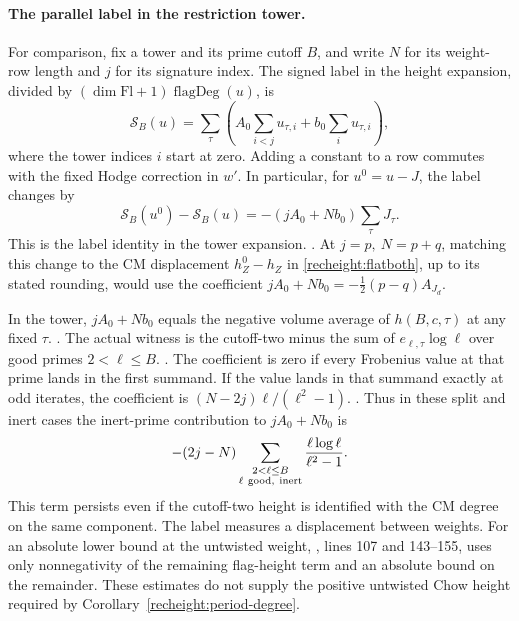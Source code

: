 \paragraph{The parallel label in the restriction tower.}
For comparison, fix a tower and its prime cutoff \(B\), and write
\(N\) for its weight-row length and \(j\) for its signature index.
The signed label in the height expansion, divided by
\((\dim\mathrm{Fl}+1)\operatorname{flagDeg}(u)\), is
\[
 \mathcal S_B(u)=\sum_\tau
   \left(A_0\sum_{i<j}u_{\tau,i}+b_0\sum_i u_{\tau,i}\right),
\]
where the tower indices \(i\) start at zero. Adding a constant to a
row commutes with the fixed Hodge correction in \(w'\). In particular,
for \(u^0=u-J\), the label changes by
\[
 \mathcal S_B(u^0)-\mathcal S_B(u)
        =-(jA_0+Nb_0)\sum_\tau J_\tau .
\]
This is the label identity in the tower expansion.
.
At \(j=p,\ N=p+q\), matching
this change to the CM displacement \(h_Z^0-h_Z\) in
\eqref{recheight:flatboth}, up to its stated rounding, would use the
coefficient \(jA_0+Nb_0=-\tfrac12(p-q)A_{J_d}\).

In the tower, \(jA_0+Nb_0\) equals the negative volume average of
\(h(B,c,\tau)\) at any fixed \(\tau\).
.
The actual witness is the
cutoff-two  minus the sum of
\(e_{\ell,\tau}\log\ell\) over good primes \(2<\ell\le B\).
.
The coefficient is zero if every Frobenius value at that prime lands in the first
summand. If the value lands in that summand exactly at odd iterates,
the coefficient is \((N-2j)\ell/(\ell^2-1)\).
.
Thus in these split and inert cases the inert-prime contribution to
\(jA_0+Nb_0\) is
\[
       -(2j-N)\sum_{\substack{2<\ell\le B\\
                         \ell\ {\rm good,\ inert}}}
                      \frac{\ell\log\ell}{\ell^2-1}.
\]
This term persists even if the cutoff-two height is identified with
the CM degree on the same component. The label measures a displacement
between weights. For an absolute lower bound at the untwisted weight,
, lines 107 and 143--155, uses only nonnegativity
of the remaining flag-height term and an absolute bound on the
remainder. These estimates do not supply the positive untwisted Chow
height required by Corollary~\ref{recheight:period-degree}.
